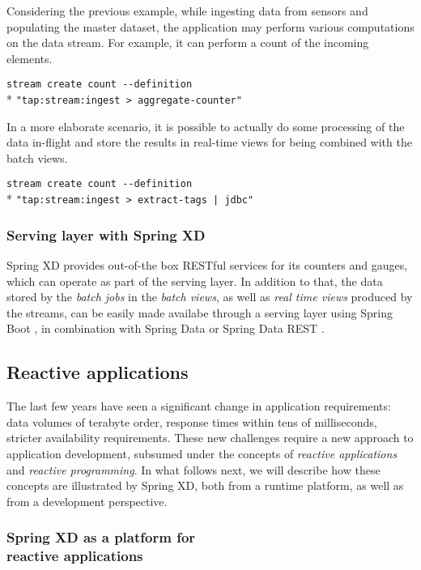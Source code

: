 Considering the previous example, while ingesting data from sensors and 
populating the master dataset, the application may perform various computations 
on the data stream. For example, it can perform a count of the incoming elements. 

\verb;stream create count --definition  ;\\*
\verb;"tap:stream:ingest > aggregate-counter";

In a more elaborate scenario, it is possible to actually do 
some processing of the data in-flight and store the results in real-time views
for being combined with the batch views.

\verb;stream create count --definition  ;\\*
\verb;"tap:stream:ingest > extract-tags | jdbc";

\subsubsection {Serving layer with Spring XD}

Spring XD provides out-of-the box RESTful services for its counters and gauges,
which can operate as part of the serving layer. In addition to that,  
the data stored by the \emph{batch jobs} in the 
\emph{batch views}, as well as \emph{real time views} produced by the streams, 
can be easily made availabe through a serving layer using Spring Boot \cite{spring-boot},
in combination with Spring Data \cite{spring-data} or Spring Data REST \cite{spring-data-rest}.

\subsection {Reactive applications}

The last few years have seen a significant change in application requirements:
data volumes of terabyte order, response times within tens of milliseconds, stricter
availability requirements. These new challenges require a new approach to application
development, subsumed under the concepts of \emph{reactive applications} and \emph{reactive
programming}. In what follows next, we will describe how these concepts are
illustrated by Spring XD, both from a runtime platform, as well as from a development perspective.

\subsubsection {Spring XD as a platform for \\ reactive applications}

